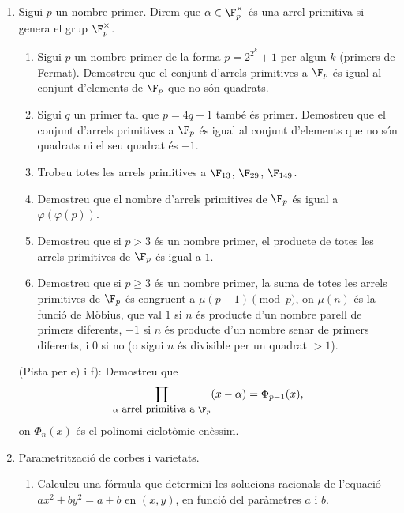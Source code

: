 \begin{enumerate}[leftmargin=*]
\item Sigui $p$ un nombre primer. Direm que $\alpha \in \F_p^\times$ és una
arrel primitiva si genera el grup $\F_p^\times$.

\begin{enumerate}
\item Sigui $p$ un nombre primer de la forma $p=2^{2^k}+1$
per algun $k$ (primers de Fermat). Demostreu que el conjunt d'arrels
primitives a $\F_p$ és igual al conjunt d'elements de $\F_p$ que no
són quadrats.

\item Sigui $q$ un primer tal que $p=4q+1$ també és primer. Demostreu que el conjunt
d'arrels primitives a $\F_p$ és igual al conjunt d'elements que no
són quadrats ni el seu quadrat és $-1$.

\item Trobeu totes les arrels primitives a $\F_{13}$,
$\F_{29}$, $\F_{149}$.

\item Demostreu que el nombre d'arrels primitives de $\F_p$ és
igual a $\varphi(\varphi(p))$.

\item Demostreu que si $p>3$ és un nombre primer, el producte
de totes les arrels primitives de $\F_p$ és igual a $1$.

\item Demostreu que si $p\ge 3$ és un nombre primer, la suma
de totes les arrels primitives de $\F_p$ és congruent a $\mu(p-1)
\pmod{p}$, on $\mu(n)$ és la funció de Möbius, que val $1$ si $n$ és
producte d'un nombre parell de primers diferents, $-1$ si $n$ és
producte d'un nombre senar de primers diferents, i $0$ si no (o
sigui $n$ és divisible per un quadrat $>1$).


\end{enumerate}


(Pista per e) i f): Demostreu que
$$\prod_{\alpha\mbox{\small{} arrel primitiva a } \F_p}
(x-\alpha)=\Phi_{p-1}(x),$$ on $\Phi_n(x)$ és el polinomi ciclotòmic enèssim.


\item Parametrització de corbes i varietats.

\begin{enumerate}

\item Calculeu una fórmula que determini les solucions
racionals de l'equació $ax^2+by^2=a+b$ en $(x,y)$, en funció del
paràmetres $a$ i $b$.


\end{enumerate}
\end{enumerate}
